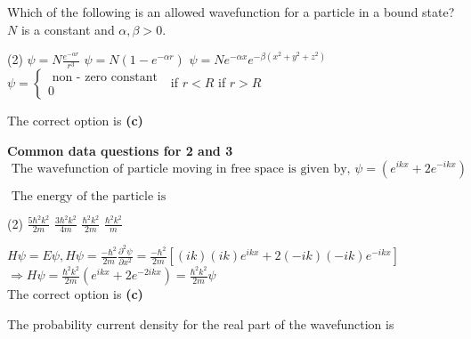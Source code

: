 \begin{enumerate}
	\begin{minipage}{\textwidth}
		\item Which of the following is an allowed wavefunction for a particle in a bound state? $N$ is a constant and $\alpha, \beta>0$.
	\end{minipage}
	\begin{tasks}(2)
		\task[\textbf{A.}] $\psi=N \frac{e^{-\alpha r}}{r^{3}}$
		\task[\textbf{B.}]$\psi=N\left(1-e^{-\alpha r}\right)$
		\task[\textbf{C.}]$\psi=N e^{-\alpha x} e^{-\beta\left(x^{2}+y^{2}+z^{2}\right)}$
		\task[\textbf{D.}]$\psi=\left\{\begin{array}{l}\text { non - zero constant } \\ 0\end{array}\right.$
		if $r<R$ if $r>R$
	\end{tasks}
	\begin{answer}
		The correct option is \textbf{(c)}
	\end{answer}
	\textbf{Common data questions for 2 and 3}\\
	$\text { The wavefunction of particle moving in free space is given by, } \psi=\left(e^{i k x}+2 e^{-i k x}\right)$\\
	\begin{minipage}{\textwidth}
		\item $\text { The energy of the particle is }$
	\end{minipage}
	\begin{tasks}(2)
		\task[\textbf{A.}] $\frac{5 \hbar^{2} k^{2}}{2 m}$
		\task[\textbf{B.}]$\frac{3 \hbar^{2} k^{2}}{4 m}$
		\task[\textbf{C.}]$\frac{\hbar^{2} k^{2}}{2 m}$
		\task[\textbf{D.}]$\frac{\hbar^{2} k^{2}}{m}$
	\end{tasks}
	\begin{answer}
		$H \psi=E \psi, H \psi=\frac{-\hbar^{2}}{2 m} \frac{\partial^{2} \psi}{\partial x^{2}}=\frac{-\hbar^{2}}{2 m}\left[(i k)(i k) e^{i k x}+2(-i k)(-i k) e^{-i k x}\right]$\\
		$\Rightarrow H \psi=\frac{\hbar^{2} k^{2}}{2 m}\left(e^{i k x}+2 e^{-2 i k x}\right)=\frac{\hbar^{2} k^{2}}{2 m} \psi$	\\
		The correct option is \textbf{(c)}
	\end{answer}
	\begin{minipage}{\textwidth}
		\item The probability current density for the real part of the wavefunction is
	\end{minipage}

\end{enumerate}
